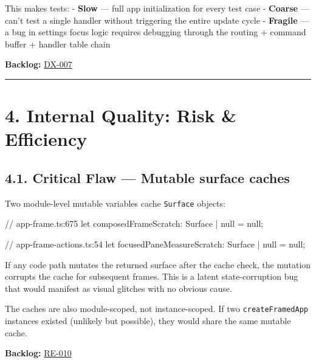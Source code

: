 This makes tests: - \textbf{Slow} --- full app initialization for every test case - \textbf{Coarse} --- can't test a single handler without triggering the entire update cycle - \textbf{Fragile} --- a bug in settings focus logic requires debugging through the routing + command buffer + handler table chain

\textbf{Backlog:} \href{https://github.com/flyingrobots/bijou/blob/cbd70612140e7a450d764b3c7be1c6af878b99bc/docs/method/graveyard/legacy-backlog/bad-code/DX-007-decompose-app-frame-mega-closure.md}{DX-007}

\begin{center}\rule{0.5\linewidth}{0.5pt}\end{center}

\section{4. Internal Quality: Risk \& Efficiency}\label{record-411-internal-quality-risk-efficiency}

\subsection{4.1. Critical Flaw --- Mutable surface caches}\label{record-411-critical-flaw-mutable-surface-caches}

Two module-level mutable variables cache \texttt{S\allowbreak{}u\allowbreak{}r\allowbreak{}f\allowbreak{}a\allowbreak{}c\allowbreak{}e} objects:

\begin{CodeBlock}
// app-frame.ts:675
let composedFrameScratch: Surface | null = null;

// app-frame-actions.ts:54
let focusedPaneMeasureScratch: Surface | null = null;
\end{CodeBlock}

If any code path mutates the returned surface after the cache check, the mutation corrupts the cache for subsequent frames. This is a latent state-corruption bug that would manifest as visual glitches with no obvious cause.

The caches are also module-scoped, not instance-scoped. If two \texttt{c\allowbreak{}r\allowbreak{}e\allowbreak{}a\allowbreak{}t\allowbreak{}e\allowbreak{}F\allowbreak{}r\allowbreak{}a\allowbreak{}m\allowbreak{}e\allowbreak{}d\allowbreak{}A\allowbreak{}p\allowbreak{}p} instances existed (unlikely but possible), they would share the same mutable cache.

\textbf{Backlog:} \href{https://github.com/flyingrobots/bijou/blob/cbd70612140e7a450d764b3c7be1c6af878b99bc/docs/method/graveyard/legacy-backlog/bad-code/RE-010-mutable-surface-caches.md}{RE-010}


